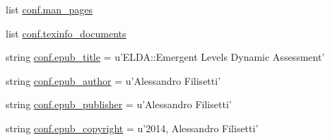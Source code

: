 \begin{DoxyCompactItemize}
\item 
list \hyperlink{a00134_a85efc5fee48a26fa2d651f6eeb38fc2b}{conf.\+man\+\_\+pages}
\item 
list \hyperlink{a00134_a54b0faed214ac92017d5689efbb10672}{conf.\+texinfo\+\_\+documents}
\item 
string \hyperlink{a00134_a9e0d62d22b83ce34deb3f16ba63cedfe}{conf.\+epub\+\_\+title} = u'E\+L\+D\+A\+::\+Emergent Levels Dynamic Assessment'
\item 
string \hyperlink{a00134_a986ebf7aa037c6bf39add300ab98a611}{conf.\+epub\+\_\+author} = u'Alessandro Filisetti'
\item 
string \hyperlink{a00134_a13c40319d84c9383e0d119773cc1ed02}{conf.\+epub\+\_\+publisher} = u'Alessandro Filisetti'
\item 
string \hyperlink{a00134_a443008520a058a726d07c6b5ccf45366}{conf.\+epub\+\_\+copyright} = u'2014, Alessandro Filisetti'
\end{DoxyCompactItemize}
